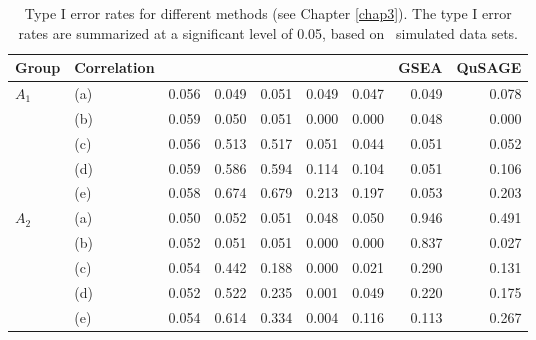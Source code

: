 \begin{appendices}
	\begin{landscape}		
	\begin{table}[ht]
		\caption[Type I error rates for different methods]{Type I error rates for different methods 
				(see Chapter \ref{chap3}). The type I error rates are summarized at a significant 
				level of 0.05, based on \HowmanySimu~simulated data sets.}
			\label{table:apptypeIerror}
		\centering
		\begin{tabular}{llrrrrrrr}
			\hline
		Group & Correlation & \OurMethod & \genr & \gent & \CMT & \CMR & GSEA & QuSAGE \\
			\hline
			\multirow{5}{*}{$A_1$}  & (a) & 0.056 & 0.049 & 0.051 & 0.049 & 0.047 & 0.049 & 0.078 
			\\ 
			 & (b) & 0.059 & 0.050 & 0.051 & 0.000 & 0.000 & 0.048 & 0.000 \\ 
			 & (c) & 0.056 & 0.513 & 0.517 & 0.051 & 0.044 & 0.051 & 0.052 \\ 
			 & (d) & 0.059 & 0.586 & 0.594 & 0.114 & 0.104 & 0.051 & 0.106 \\ 
			 & (e) & 0.058 & 0.674 & 0.679 & 0.213 & 0.197 & 0.053 & 0.203 \\ \hline
			\multirow{5}{*}{$A_2$} & (a) & 0.050 & 0.052 & 0.051 & 0.048 & 0.050 & 0.946 & 0.491 \\ 
			 & (b) & 0.052 & 0.051 & 0.051 & 0.000 & 0.000 & 0.837 & 0.027 \\ 
			 & (c) & 0.054 & 0.442 & 0.188 & 0.000 & 0.021 & 0.290 & 0.131 \\ 
			 & (d) & 0.052 & 0.522 & 0.235 & 0.001 & 0.049 & 0.220 & 0.175 \\ 
			 & (e) & 0.054 & 0.614 & 0.334 & 0.004 & 0.116 & 0.113 & 0.267 \\ 
			\hline
		\end{tabular}
	\end{table}
	
	\end{landscape}	

\end{appendices}
	



\newpage